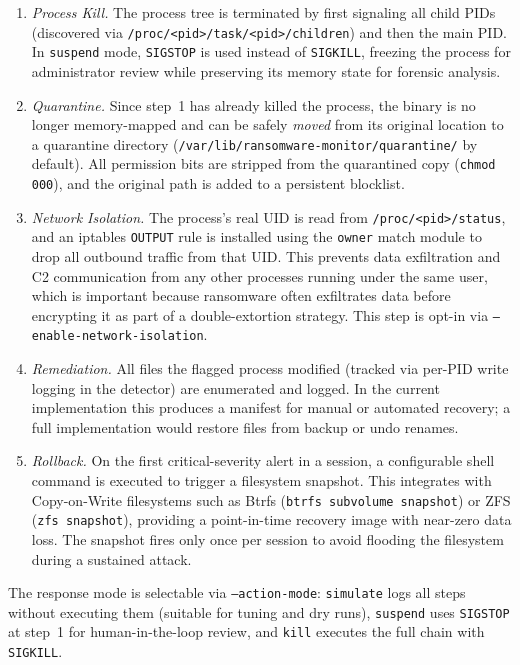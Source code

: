 \documentclass[twocolumn, 10pt]{scrartcl}
\begin{document}
\begin{enumerate}
    \item \textit{Process Kill.} The process tree is terminated by first signaling all child PIDs (discovered via \texttt{/proc/<pid>/task/<pid>/children}) and then the main PID. In \texttt{suspend} mode, \texttt{SIGSTOP} is used instead of \texttt{SIGKILL}, freezing the process for administrator review while preserving its memory state for forensic analysis.

    \item \textit{Quarantine.} Since step~1 has already killed the process, the binary is no longer memory-mapped and can be safely \emph{moved} from its original location to a quarantine directory (\texttt{/var/lib/ransomware-monitor/quarantine/} by default). All permission bits are stripped from the quarantined copy (\texttt{chmod 000}), and the original path is added to a persistent blocklist. 

    \item \textit{Network Isolation.} The process's real UID is read from \texttt{/proc/<pid>/status}, and an iptables \texttt{OUTPUT} rule is installed using the \texttt{owner} match module to drop all outbound traffic from that UID. This prevents data exfiltration and C2 communication from any other processes running under the same user, which is important because ransomware often exfiltrates data before encrypting it as part of a double-extortion strategy. This step is opt-in via \texttt{--enable-network-isolation}.

    \item \textit{Remediation.} All files the flagged process modified (tracked via per-PID write logging in the detector) are enumerated and logged. In the current implementation this produces a manifest for manual or automated recovery; a full implementation would restore files from backup or undo renames.

    \item \textit{Rollback.} On the first critical-severity alert in a session, a configurable shell command is executed to trigger a filesystem snapshot. This integrates with Copy-on-Write filesystems such as Btrfs (\texttt{btrfs subvolume snapshot}) or ZFS (\texttt{zfs snapshot}), providing a point-in-time recovery image with near-zero data loss. The snapshot fires only once per session to avoid flooding the filesystem during a sustained attack.
\end{enumerate}

The response mode is selectable via \texttt{--action-mode}: \texttt{simulate} logs all steps without executing them (suitable for tuning and dry runs), \texttt{suspend} uses \texttt{SIGSTOP} at step~1 for human-in-the-loop review, and \texttt{kill} executes the full chain with \texttt{SIGKILL}.
\end{document}
